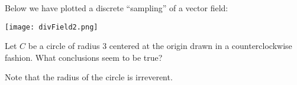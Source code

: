 \documentclass{ximera}
\begin{document}
\begin{exercise}
  Below we have plotted a discrete ``sampling'' of a vector field:
  \begin{image}
    \texttt{[image: divField2.png]}
  \end{image}
  Let $C$ be a circle of radius $3$ centered at the origin drawn in a
  counterclockwise fashion.  What conclusions seem to be true?
  \begin{selectAll}
  \end{selectAll}
  \begin{hint}
    Note that the radius of the circle is irreverent. 
  \end{hint}
\end{exercise}
\end{document}
